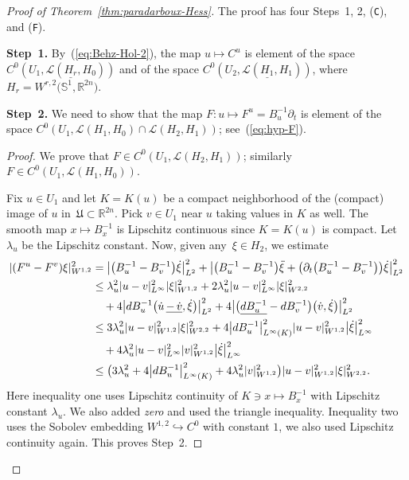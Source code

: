 \documentclass[10pt,a4paper]{amsart}
\def\abs#1{\mathopen|#1\mathclose|}
\newcommand{\INTO}{\hookrightarrow} %
\newcommand{\Ll}{{\mathcal{L}}} %
\newcommand{\R}{{\mathbb{R}}}
\newcommand{\p}{{\partial}}
\renewcommand{\SS}{{\mathbb{S}}}
\begin{document}
\begin{proof}[Proof of Theorem~\ref{thm:paradarboux-Hess}]
The proof has four Steps~1, 2, (\texttt{C}), and (\texttt{F}).

\medskip\noindent
\textbf{Step~1.}
By~(\ref{eq:Behz-Hol-2}),
the map $u\mapsto C^u$ is element of the space
$C^0(U_1,\Ll(\underline{H_r},H_0))$ and of the space
$C^0(U_2,\Ll(\underline{H_1},H_1))$,
where $H_r=W^{r,2}\bigl(\SS^1,\R^{2n}\bigr)$.


\medskip\noindent
\textbf{Step~2.}
We need to show that the map $F\colon u\mapsto F^u=B_u^{-1}\p_t$
is element of the space $C^0(U_1,\Ll(H_1,H_0)\cap\Ll(H_2,H_1))$;
see~(\ref{eq:hyp-F}).

\begin{proof}
We prove that $F\in C^0(U_1,\Ll(H_2,H_1))$;
similarly $F\in C^0(U_1,\Ll(H_1,H_0))$.

Fix $u\in U_1$ and let $K=K(u)$ be a compact neighborhood
of the (compact) image of $u$ in~${\mathfrak{U}\subset\R^{2n}}$.
Pick $v\in U_1$ near $u$ taking values in $K$ as well.
The smooth map $x\mapsto B_x^{-1}$ is Lipschitz continuous
since $K=K(u)$ is compact. Let $\lambda_u$ be the Lipschitz constant.
Now, given any~${\xi\in H_2}$, we estimate
\begin{equation*}
\begin{split}
 \abs{(F^u-F^v)\xi}_{W^{1,2}}^2
 &=\bigl|\bigl(B_u^{-1}-B_v^{-1}\bigr)\dot\xi\bigr|_{L^2}^2
 +\bigl|
 \bigl(B_u^{-1}-B_v^{-1}\bigr)\ddot\xi
 +\bigl(\p_t\bigl(B_u^{-1}-B_v^{-1}\bigr)\bigr)\dot\xi
 \bigr|_{L^2}^2
\\
 &\le\lambda_u^2\abs{u-v}_{L^\infty}^2\abs{\xi}_{W^{1,2}}^2
 +2\lambda_u^2\abs{u-v}_{L^\infty}^2\abs{\xi}_{W^{2,2}}^2
 \\
 &\quad{}
 +4 \bigl|{\rm d}B_u^{-1}\bigl(\dot u\,\underline{-\,\dot v},\dot\xi\bigr)\bigr|_{L^2}^2
 +4 \bigl|\bigl(\underline{{\rm d}B_u^{-1}}-{\rm d}B_v^{-1}\bigr)\bigl(\dot v,\dot\xi\bigr)\bigr|_{L^2}^2
\\
 &\le3\lambda_u^2\abs{u-v}_{W^{1,2}}^2\abs{\xi}_{W^{2,2}}^2
 +4\bigl|{\rm d}B_u^{-1}\bigr|_{L^\infty(K)}^2\abs{u-v}_{W^{1,2}}^2\bigl|\dot\xi\bigr|_{L^\infty}^2
 \\
 &\quad{}
 +4\lambda_u^2\abs{u-v}_{L^\infty}^2\abs{v}_{W^{1,2}}^2\bigl|\dot\xi\bigr|_{L^\infty}^2
\\
 &\le\bigl(3\lambda_u^2+4\bigl|{\rm d}B_u^{-1}\bigr|_{L^\infty(K)}^2
 +4\lambda_u^2 \abs{v}_{W^{1,2}}^2\bigr)
 \abs{u-v}_{W^{1,2}}^2 \abs{\xi}_{W^{2,2}}^2.
\end{split}
\end{equation*}
Here inequality one uses Lipschitz continuity of $K\ni x\mapsto B_x^{-1}$
with Lipschitz constant $\lambda_u$. We also added \textit{zero}
and used the triangle inequality.
Inequality two uses the Sobolev embedding $W^{1,2}\INTO C^0$ with
constant $1$, we also used Lipschitz continuity again.
This proves Step~2.
\end{proof}



\end{proof}
\end{document}
